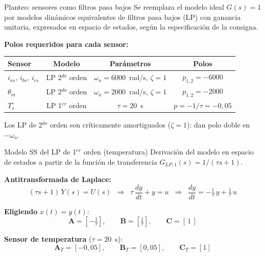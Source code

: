 \documentclass[aspectratio=169,t]{beamer}
\begin{document}
\begin{frame}{Planteo: sensores como filtros pasa bajos}
{\small\color{uncGray}Se reemplaza el modelo ideal $G(s)=1$ por modelos dinámicos equivalentes de filtros pasa bajos (LP) con ganancia unitaria, expresados en espacio de estados, según la especificación de la consigna.}\par
\vspace{3mm}

\textbf{Polos requeridos para cada sensor:}
\vspace{1mm}

\centering
\footnotesize
\renewcommand{\arraystretch}{1.2}
\begin{tabular}{|l|c|c|c|}
\hline
\textbf{Sensor} & \textbf{Modelo} & \textbf{Parámetros} & \textbf{Polos} \\
\hline
$i_{as},\,i_{bs},\,i_{cs}$ & LP 2$^{do}$ orden & $\omega_n = 6000$~rad/s, $\zeta = 1$ & $p_{1,2} = -6000$ \\
$\theta_m$ & LP 2$^{do}$ orden & $\omega_n = 2000$~rad/s, $\zeta = 1$ & $p_{1,2} = -2000$ \\
$T_s^\circ$ & LP 1$^{er}$ orden & $\tau = 20$~s & $p = -1/\tau = -0{,}05$ \\
\hline
\end{tabular}
\normalsize

\vspace{4mm}
{\small Los LP de 2$^{do}$ orden son críticamente amortiguados ($\zeta=1$): dan polo doble en $-\omega_n$.}
\end{frame}

\begin{frame}{Modelo SS del LP de 1$^{er}$ orden (temperatura)}
{\small\color{uncGray}Derivación del modelo en espacio de estados a partir de la función de transferencia $G_{LP,1}(s)=1/(\tau s + 1)$.}\par
\vspace{3mm}

\textbf{Antitransformada de Laplace:}
\begin{equation*}
(\tau s + 1)\,Y(s) = U(s)
\;\;\Longrightarrow\;\;
\tau\,\frac{dy}{dt} + y = u
\;\;\Longrightarrow\;\;
\frac{dy}{dt} = -\tfrac{1}{\tau}\,y + \tfrac{1}{\tau}\,u
\end{equation*}

\textbf{Eligiendo} $x(t) = y(t)$:
\begin{equation*}
\bm{A} = \left[-\tfrac{1}{\tau}\right],
\qquad
\bm{B} = \left[\tfrac{1}{\tau}\right],
\qquad
\bm{C} = [\,1\,]
\end{equation*}

\textbf{Sensor de temperatura} ($\tau = 20$~s):
\begin{equation*}
\bm{A}_T = [-0{,}05],
\qquad
\bm{B}_T = [0{,}05],
\qquad
\bm{C}_T = [1]
\end{equation*}
\end{frame}
\end{document}
